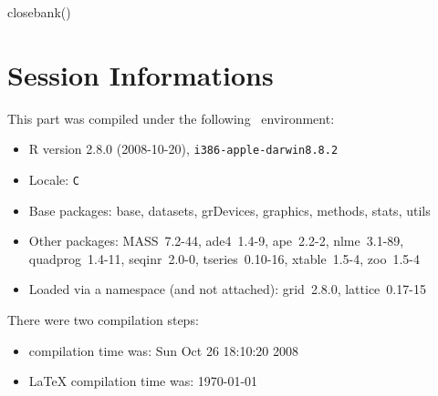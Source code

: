 \documentclass{article}
\begin{document}
\begin{Schunk}
\begin{Sinput}
 closebank()
\end{Sinput}
\end{Schunk}


\section*{Session Informations}

This part was compiled under the following \Rlogo{}~environment:

\begin{itemize}
  \item R version 2.8.0 (2008-10-20), \verb|i386-apple-darwin8.8.2|
  \item Locale: \verb|C|
  \item Base packages: base, datasets, grDevices, graphics, methods,
    stats, utils
  \item Other packages: MASS~7.2-44, ade4~1.4-9, ape~2.2-2,
    nlme~3.1-89, quadprog~1.4-11, seqinr~2.0-0, tseries~0.10-16,
    xtable~1.5-4, zoo~1.5-4
  \item Loaded via a namespace (and not attached): grid~2.8.0,
    lattice~0.17-15
\end{itemize}
There were two compilation steps:

\begin{itemize}
  \item \Rlogo{} compilation time was: Sun Oct 26 18:10:20 2008
  \item \LaTeX{} compilation time was: \today
\end{itemize}


\clearpage
{}


\end{document}
